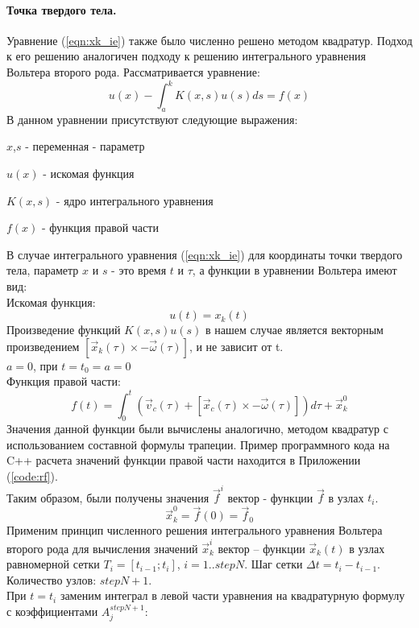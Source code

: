 \documentclass[12pt,a4paper]{article}
\begin{document}
\paragraph{Точка твердого тела.}
Уравнение (\ref{eqn:xk_ie}) также было численно решено методом квадратур. Подход к его решению аналогичен подходу к решению интегрального уравнения Вольтера второго рода. Рассматривается уравнение:
\begin{equation}
\label{eqn:Volter2}
u(x)-\int_{a}^{k} K(x,s)u(s)ds=f(x)
\end{equation}
В данном уравнении присутствуют следующие выражения:
\begin{list}{}{}
\item $x$,$s$ - переменная - параметр
\item $u(x)$ - искомая функция
\item $K(x,s)$ - ядро интегрального уравнения
\item $f(x)$ - функция правой части
\end{list}
В случае интегрального уравнения (\ref{eqn:xk_ie}) для координаты точки твердого тела, параметр $x$ и $s$ - это время $t$ и $\tau$, а функции в уравнении Вольтера имеют вид:\\
Искомая функция:
\[
u(t)=x_k(t)
\]
Произведение функций $K(x,s)u(s)$ в нашем случае является векторным произведением $[\overrightarrow{x}_k(\tau)\times-\overrightarrow{\omega}(\tau)]$, и не зависит от t.\\
$a=0$, при $t=t_0=a=0$\\
Функция правой части:\\
\begin{equation}
\label{eqn:rf}
f(t)=\int_{0}^{t}(\overrightarrow{v}_c(\tau)+[\overrightarrow{x}_c(\tau)\times-\overrightarrow{\omega}(\tau)])d\tau+\overrightarrow{x}_k^0
\end{equation}
Значения данной функции были вычислены аналогично, методом квадратур с использованием составной формулы трапеции. Пример программного кода на C++ расчета значений функции правой части находится в Приложении (\ref{code:rf}).\\
Таким образом, были получены значения                                 $\overrightarrow{f}^i$ вектор - функции $\overrightarrow{f}$ в узлах $t_i$.\\
\[
\overrightarrow{x}_k^0=\overrightarrow{f}(0)=\overrightarrow{f}_0
\]
Применим принцип численного решения интегрального уравнения Вольтера второго рода для вычисления значений $\overrightarrow{x}_k^i$ вектор – функции $\overrightarrow{x}_k(t)$ в узлах равномерной сетки $T_i=[t_{i-1}; t_i]$, $i=1..stepN$. Шаг сетки $\Delta t= t_i-t_{i-1}$. Количество узлов: $stepN+1$.\\
При $t=t_i$ заменим интеграл в левой части уравнения на квадратурную формулу с коэффициентами $A_j^{stepN+1}$:
\end{document}
